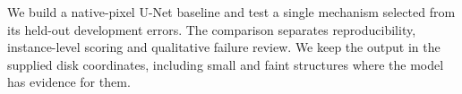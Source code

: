 We build a native-pixel U-Net baseline and test a single mechanism selected from its held-out development errors. The comparison separates reproducibility, instance-level scoring and qualitative failure review. We keep the output in the supplied disk coordinates, including small and faint structures where the model has evidence for them.
